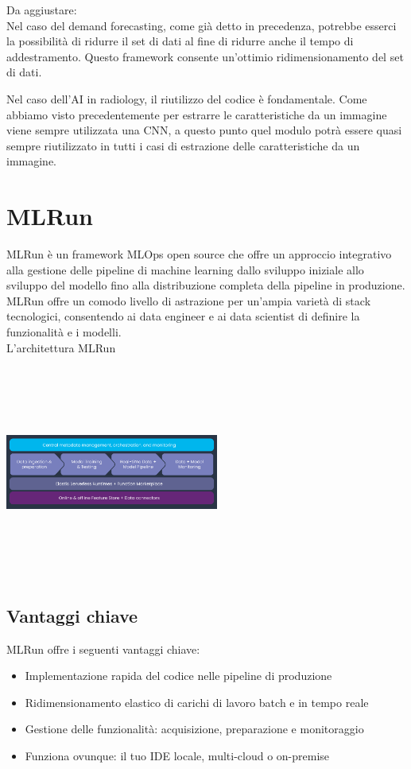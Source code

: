 \documentclass[12pt,a4paper]{report}
\begin{document}
Da aggiustare:\\
Nel caso del demand forecasting, come già detto in precedenza, potrebbe esserci la possibilità di ridurre il set di dati al fine di ridurre anche il tempo di addestramento. Questo framework consente un'ottimio ridimensionamento del set di dati.

Nel caso dell'AI in radiology, il riutilizzo del codice è fondamentale. Come abbiamo visto precedentemente per estrarre le caratteristiche da un immagine viene sempre utilizzata una CNN, a questo punto quel modulo potrà essere quasi sempre riutilizzato in tutti i casi di estrazione delle caratteristiche da un immagine.

\section{MLRun}
MLRun è un framework MLOps open source che offre un approccio integrativo alla gestione delle pipeline di machine learning dallo sviluppo iniziale allo sviluppo del modello fino alla distribuzione completa della pipeline in produzione. MLRun offre un comodo livello di astrazione per un'ampia varietà di stack tecnologici, consentendo ai data engineer e ai data scientist di definire la funzionalità e i modelli.\\
L'architettura MLRun
\begin{center}
    \includegraphics[width=7cm,height=7cm,keepaspectratio]{MLRun}
\end{center}

\subsection{Vantaggi chiave}
MLRun offre i seguenti vantaggi chiave:

\begin{itemize}
    \item Implementazione rapida del codice nelle pipeline di produzione
    \item Ridimensionamento elastico di carichi di lavoro batch e in tempo reale
    \item Gestione delle funzionalità: acquisizione, preparazione e monitoraggio
    \item Funziona ovunque: il tuo IDE locale, multi-cloud o on-premise
\end{itemize}
\end{document}
